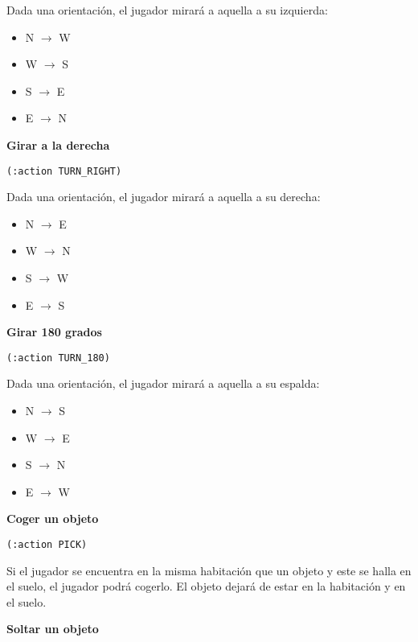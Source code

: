 \documentclass[11pt,a4paper]{article}
\begin{document}
\smallskip

Dada una orientación, el jugador mirará a aquella a su izquierda:

\begin{itemize}
\item N $\rightarrow$ W
\item W $\rightarrow$ S
\item S $\rightarrow$ E
\item E $\rightarrow$ N
\end{itemize}

\medskip

\large{\textbf{Girar a la derecha}}

\texttt{(:action TURN\_RIGHT)}

\smallskip

Dada una orientación, el jugador mirará a aquella a su derecha:

\begin{itemize}
\item N $\rightarrow$ E
\item W $\rightarrow$ N
\item S $\rightarrow$ W
\item E $\rightarrow$ S
\end{itemize}

\medskip

\large{\textbf{Girar 180 grados}}

\texttt{(:action TURN\_180)}

\smallskip

Dada una orientación, el jugador mirará a aquella a su espalda:

\begin{itemize}
\item N $\rightarrow$ S
\item W $\rightarrow$ E
\item S $\rightarrow$ N
\item E $\rightarrow$ W
\end{itemize}

\medskip

\large{\textbf{Coger un objeto}}

\texttt{(:action PICK)}

\smallskip

Si el jugador se encuentra en la misma habitación que un objeto y este se halla en el suelo,
el jugador podrá cogerlo. El objeto dejará de estar en la habitación y en el suelo.

\medskip

\large{\textbf{Soltar un objeto}}
\end{document}

